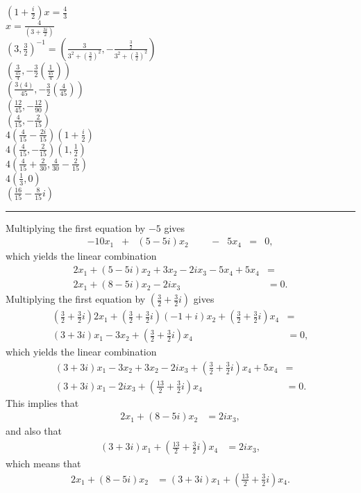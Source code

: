 \documentclass[12pt]{article}
\begin{document}
\begin{enumerate}
      $(1 + \frac{i}{2})x = \frac{4}{3}$\\
      $x = \frac{4}{(3 + \frac{3i}{2})}$\\
      $(3, \frac{3}{2})^{-1} = (\frac{3}{3^{2} + (\frac{3}{2})^2}, -\frac{\frac{3}{2}}{3^{2} + (\frac{3}{2})^2})$\\
      $(\frac{3}{\frac{45}{4}}, -\frac{3}{2}(\frac{1}{\frac{45}{4}}))$\\
      $(\frac{3(4)}{45}, -\frac{3}{2}(\frac{4}{45}))$\\
      $(\frac{12}{45}, -\frac{12}{90})$\\
      $(\frac{4}{15}, -\frac{2}{15})$\\

      $4(\frac{4}{15} - \frac{2i}{15})(1 + \frac{i}{2})$\\
      $4(\frac{4}{15}, -\frac{2}{15})(1, \frac{1}{2})$\\
      $4(\frac{4}{15} + \frac{2}{30}, \frac{4}{30} - \frac{2}{15})$\\
      $4(\frac{1}{3}, 0)$\\

      $(\frac{16}{15} - \frac{8}{15}i)$

      \noindent\rule{\textwidth}{1pt}

      Multiplying the first equation by $-5$ gives
      \[
      \begin{array}{rcrcrcrcl}
        -10x_1 & + & (5 - 5i)x_2 &   &       & - & 5x_4 & = & 0,
      \end{array}
      \]
      which yields the linear combination
      \begin{align*}
        2x_1 + (5 - 5i)x_2 + 3x_2 - 2ix_3 - 5x_4 + 5x_4 &=\\
        2x_1 + (8 - 5i)x_2 - 2ix_3 &= 0.
      \end{align*}
      Multiplying the first equation by $(\frac{3}{2} + \frac{3}{2}i)$ gives
      \begin{align*}
        (\frac{3}{2} + \frac{3}{2}i)2x_1 + (\frac{3}{2} + \frac{3}{2}i)(-1 + i)x_2 + (\frac{3}{2} + \frac{3}{2}i)x_4 &=\\
        (3 + 3i)x_1 - 3x_2 + (\frac{3}{2} + \frac{3}{2}i)x_4 &= 0,
      \end{align*}
      which yields the linear combination
      \begin{align*}
        (3 + 3i)x_1 - 3x_2 + 3x_2 - 2ix_3 + (\frac{3}{2} + \frac{3}{2}i)x_4 + 5x_4 &=\\
        (3 + 3i)x_1 - 2ix_3 + (\frac{13}{2} + \frac{3}{2}i)x_4 &= 0.
      \end{align*}
      This implies that
      \begin{align*}
        2x_1 + (8 - 5i)x_2 &= 2ix_3,
      \end{align*}
      and also that
      \begin{align*}
        (3 + 3i)x_1 + (\frac{13}{2} + \frac{3}{2}i)x_4 &= 2ix_3,
      \end{align*}
      which means that
      \begin{align*}
        2x_1 + (8 - 5i)x_2 &= (3 + 3i)x_1 + (\frac{13}{2} + \frac{3}{2}i)x_4.
      \end{align*}


\end{enumerate}
\end{document}
